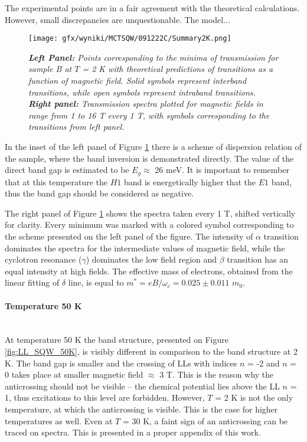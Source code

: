 \documentclass[titlepage,a4paper]{book}
\newcommand{\wciecie}{\quad\phantom{v}}
\newcommand{\myparagraph}[1]{\paragraph{#1}\mbox{}\\}
\begin{document}
The experimental points are in a fair agreement with the theoretical calculations. However, small discrepancies are unquestionable. The model... 

\begin{figure}[ht]
	\centering
	\texttt{[image: gfx/wyniki/MCTSQW/091222C/Summary2K.png]}
	\vspace{-10pt}
	\caption{\textit{\textbf{Left Panel:} Points corresponding to the minima of transmission for sample B at $T$ = 2 K with theoretical predictions of transitions as a function of magnetic field. Solid symbols represent interband transitions, while open symbols represent intraband transitions. \textbf{Right panel:} Transmission spectra plotted for magnetic fields in range from 1 to 16 T every 1 T, with symbols corresponding to the transitions from left panel.}}
	\label{fig:Summary_SQW_2K}
\end{figure}

In the inset of the left panel of Figure \ref{fig:Summary_SQW_2K} there is a scheme of dispersion relation of the sample, where the band inversion is demonstrated directly. The value of the direct band gap is estimated to be $E_g \approx $ 26 meV. It is important to remember that at this temperature the $H1$ band is energetically higher that the $E1$ band, thus the band gap should be considered as negative.

The right panel of Figure \ref{fig:Summary_SQW_2K} shows the spectra taken every 1 T, shifted vertically for clarity. Every minimum was marked with a colored symbol corresponding to the scheme presented on the left panel of the figure. The intensity of $\alpha$ transition dominates the spectra for the intermediate values of magnetic field, while the cyclotron resonance ($\gamma$) dominates the low field region and $\beta$ transition has an equal intensity at high fields. The effective mass of electrons, obtained from the linear fitting of $\delta$ line, is equal to $m^* = eB/\omega_c = 0.025 \pm 0.011$ $m_0$.

\clearpage
\myparagraph{Temperature 50 K}
\wciecie
At temperature 50 K the band structure, presented on Figure \ref{fig:LL_SQW_50K}, is visibly different in comparison to the band structure at 2 K. The band gap is smaller and the crossing of LLs with indices $n$ = -2 and $n$ = 0 takes place at smaller magnetic field $\approx$ 3 T. This is the reason why the anticrossing should not be visible -- the chemical potential lies above the LL $n$ = 1, thus excitations to this level are forbidden. However, $T$ = 2 K is not the only temperature, at which the anticrossing is visible. This is the case for higher temperatures as well. Even at $T$ = 30 K, a faint sign of an anticrossing can be traced on spectra. This is presented in a proper appendix of this work.
\end{document}
